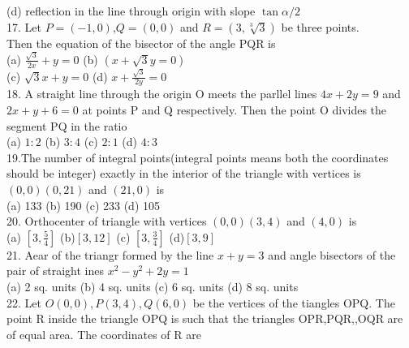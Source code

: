 \documentclass[12pt]{article}
\begin{document}
(d) reflection in the line through origin with slope $\tan\alpha/2$\\
17. Let $P=(-1,0)$,$Q=(0,0)$ and $R=(3,\sqrt[3]{3})$ be three points.\\
Then the equation of the bisector of the angle PQR is\\
(a)  $\frac{\sqrt{3}}{2x}+y=0$ \hspace{1cm}           (b)   $(x+\sqrt{3}y=0)$\\
(c)  $\sqrt{3}x+y=0$  \hspace{1cm}       (d)  $x+\frac{\sqrt{3}}{2y}=0$\\
18. A straight line through the origin O meets the parllel lines $4x+2y=9$ and $2x+y+6=0$ at points P and Q respectively. Then the point O divides the segment PQ in the ratio\\
(a) $1:2$   \hspace{1cm} (b) $3:4$  \hspace{1cm}  (c) $2:1$ \hspace{1cm}   (d) $4:3$ \\
19.The number of integral points(integral points means both the coordinates should be integer) exactly in the interior of the triangle with vertices is $(0,0)(0,21)$ and $(21,0)$ is\\
(a)  133   \hspace{1cm}  (b)  190  \hspace{1cm}   (c)  233 \hspace{1cm}  (d)   105\\
20. Orthocenter of triangle with vertices $(0,0)(3,4)$ and $(4,0)$ is \\
(a) $[3,\frac{5}{4}]$ \hspace{1cm} (b)$[3,12]$   \hspace{1cm} (c)  $[3,\frac{3}{4}]$   \hspace{1cm} (d)$[3,9]$\\
21. Aear of the triangr formed by the line $x+y=3$ and angle bisectors of the pair of straight ines $x^2-y^2+2y=1$\\
(a)  2 sq. units  \hspace{1cm}   (b)  4 sq. units  \hspace{1cm}    (c)  6 sq. units     \hspace{1cm} (d)  8 sq. units\\
22. Let $O(0,0),P(3,4),Q(6,0)$ be the vertices of the tiangles OPQ. The point R inside the triangle OPQ is such that the triangles OPR,PQR,,OQR are of equal area. The coordinates of R are \\
\end{document}
